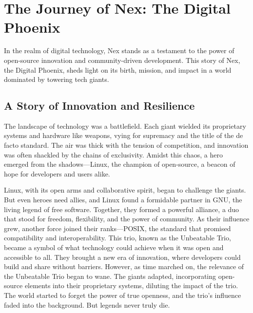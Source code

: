 \section{The Journey of Nex: The Digital Phoenix}
In the realm of digital technology, Nex stands as a testament to the power of open-source innovation and community-driven development.
This story of Nex, the Digital Phoenix, sheds light on its birth, mission, and impact in a world dominated by towering tech giants.

\subsection{A Story of Innovation and Resilience}
The landscape of technology was a battlefield.
Each giant wielded its proprietary systems and hardware like weapons, vying for supremacy and the title of the de facto standard.
The air was thick with the tension of competition, and innovation was often shackled by the chains of exclusivity.
Amidst this chaos, a hero emerged from the shadows—Linux, the champion of open-source, a beacon of hope for developers and users alike.

Linux, with its open arms and collaborative spirit, began to challenge the giants.
But even heroes need allies, and Linux found a formidable partner in GNU, the living legend of free software.
Together, they formed a powerful alliance, a duo that stood for freedom, flexibility, and the power of community.
As their influence grew, another force joined their ranks—POSIX, the standard that promised compatibility and interoperability.
This trio, known as the Unbeatable Trio, became a symbol of what technology could achieve when it was open and accessible to all.
They brought a new era of innovation, where developers could build and share without barriers.
However, as time marched on, the relevance of the Unbeatable Trio began to wane. The giants adapted, incorporating open-source elements into their proprietary systems, diluting the impact of the trio.
The world started to forget the power of true openness, and the trio's influence faded into the background.
But legends never truly die.

